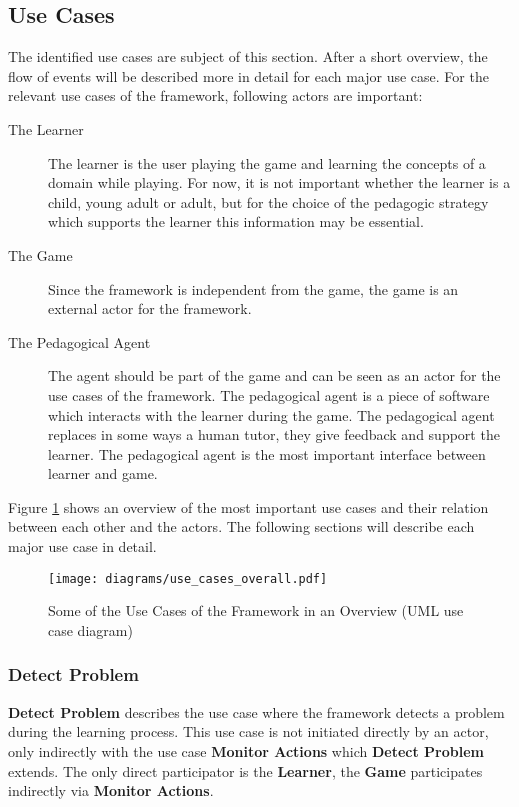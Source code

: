 \subsection{Use Cases}
The identified use cases are subject of this section. After a short overview,
the flow of events will be described more in detail for each major use case.
For the relevant use cases of the framework, following actors are important:
\begin{description}
\item[The Learner] The learner is the user playing the game and learning the
concepts of a domain while playing. For now, it is not important whether the
learner is a child, young adult or adult, but for the choice of the pedagogic
strategy which supports the learner this information may be essential.
\item[The Game] Since the framework is independent from the game, the game is an
external actor for the framework.
\item[The Pedagogical Agent] The agent should be part of the game and can be seen
as an actor for the use cases of the framework. The pedagogical agent is a
piece of software which interacts with the learner during the game. The
pedagogical agent replaces in some ways a human tutor, they give feedback and
support the learner. The pedagogical agent is the most important
interface between learner and game.
\end{description}

Figure \ref{usecase_overview} shows an overview of the most important use cases
and their relation between each other and the actors. The following sections will
describe each major use case in detail.

\begin{figure}
    \centering
    \texttt{[image: diagrams/use\_cases\_overall.pdf]}
    \caption[Some of the Use Cases of the Framework in an Overview (UML use case diagram)]
    {Some of the Use Cases of the Framework in an Overview (UML use case diagram)}
    \label{usecase_overview}
\end{figure}

\subsubsection{Detect Problem}
\textbf{Detect Problem} describes the use case where the framework
detects a problem during the learning process. This use case is not initiated
directly by an actor, only indirectly with the use case \textbf{Monitor
Actions} which \textbf{Detect Problem} extends. The only direct participator is the
\textbf{Learner}, the \textbf{Game} participates indirectly via
\textbf{Monitor Actions}.

